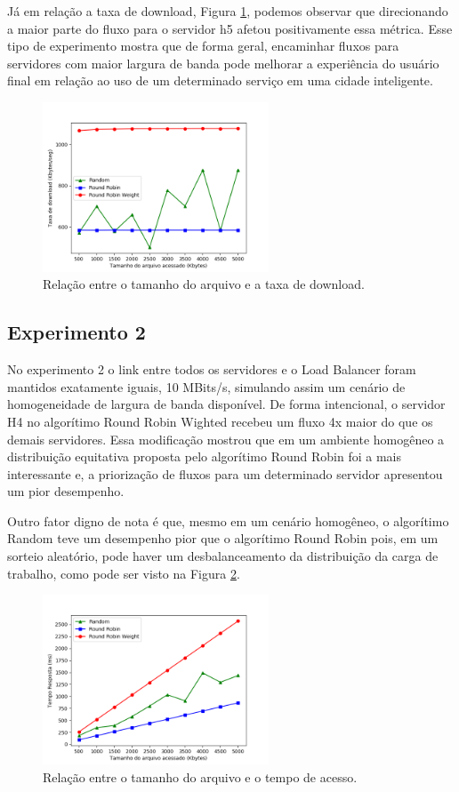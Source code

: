 \documentclass[12pt]{article}
\begin{document}
Já em relação a taxa de download, Figura \ref{fig:exp1_b}, podemos observar que direcionando a maior parte do fluxo para o servidor h5 afetou positivamente essa métrica. Esse tipo de experimento mostra que de forma geral, encaminhar fluxos para servidores com maior largura de banda pode melhorar a experiência do usuário final em relação ao uso de um determinado serviço em uma cidade inteligente.

\begin{figure}[ht]
\centering
\includegraphics[width=0.6\textwidth]{images/exp1_banda.png}
\caption{Relação entre o tamanho do arquivo e a taxa de download.}
\label{fig:exp1_b}
\end{figure}

\subsection{Experimento 2}

No experimento 2 o link entre todos os servidores e o Load Balancer foram mantidos exatamente iguais, 10 MBits/s, simulando assim um cenário de homogeneidade de largura de banda disponível. De forma intencional, o servidor H4 no algorítimo Round Robin Wighted recebeu um fluxo 4x maior do que os demais servidores. Essa modificação mostrou que em um ambiente homogêneo a distribuição equitativa proposta pelo algorítimo Round Robin foi a mais interessante e, a priorização de fluxos para um determinado servidor apresentou um pior desempenho.

Outro fator digno de nota é que, mesmo em um cenário homogêneo, o algorítimo Random teve um desempenho pior que o algorítimo Round Robin pois, em um sorteio aleatório, pode haver um desbalanceamento da distribuição da carga de trabalho, como pode ser visto na Figura \ref{fig:exp2_t}.

\begin{figure}[ht]
\centering
\includegraphics[width=0.6\textwidth]{images/exp2_time.png}
\caption{Relação entre o tamanho do arquivo e o tempo de acesso.}
\label{fig:exp2_t}
\end{figure}
\end{document}
